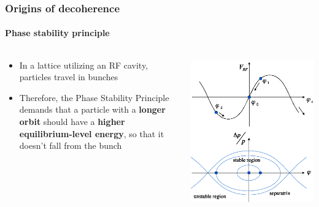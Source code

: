\documentclass{beamer}
\begin{document}
\begin{frame}\frametitle{Origins of decoherence} \framesubtitle{Phase stability principle}
  \begin{columns}
    \begin{column}{.5\textwidth}
      \begin{itemize}
      \item In a lattice utilizing an RF cavity, particles travel in bunches
      \item Therefore, the Phase Stability Principle demands that a particle with a \textbf{longer orbit} should have a \textbf{higher equilibrium-level energy}, so that it doesn't fall from the bunch
      \end{itemize}
    \end{column}
    \begin{column}{.5\textwidth}
      \centering
      \includegraphics[width=\linewidth]{../img/SEMINAR/psp_diagram}
    \end{column}
  \end{columns}
\end{frame}
\end{document}

